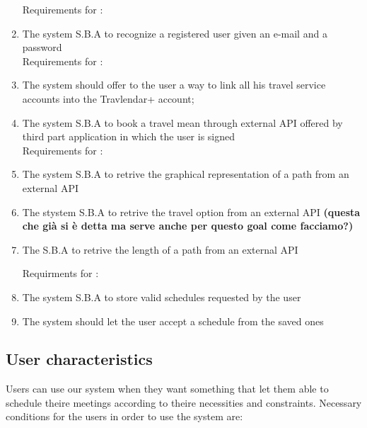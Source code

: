 \begin{enumerate}
Requirements for :
\item The system S.B.A to recognize a registered user given an e-mail and a password
\\





Requirements for : 

\item The system should offer to the user a way to link all his travel service accounts into the Travlendar+ account;

\item The system S.B.A to book a travel mean through external API offered by third part application in which the user is signed
\\


Requirements for :

\item The system S.B.A to retrive the graphical representation of a path from an external API 

\item The stystem S.B.A to retrive the travel option from an external API \textbf{(questa che già si è detta ma serve anche per questo goal come facciamo?)}

\item The S.B.A to retrive the length of a path from an external API  

Requirments for :

\item The system S.B.A to store valid schedules requested by the user

\item The system should let the user accept a schedule from the saved ones 

\end{enumerate}


\subsection{User characteristics}
Users can use our system when they want something that let them able to schedule theire meetings according to theire necessities and constraints. Necessary conditions for the users in order to use the system are: 

